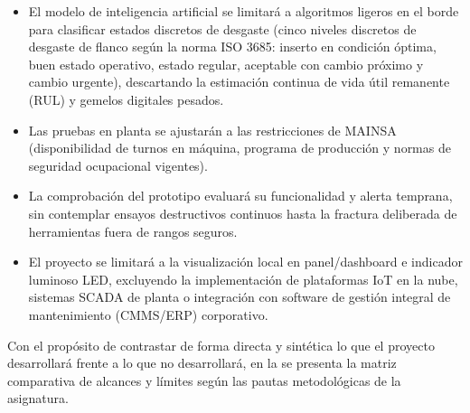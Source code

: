 \begin{itemize}
\item El modelo de inteligencia artificial se limitará a algoritmos ligeros en el borde para clasificar estados discretos de desgaste (cinco niveles discretos de desgaste de flanco según la norma ISO 3685: inserto en condición óptima, buen estado operativo, estado regular, aceptable con cambio próximo y cambio urgente), descartando la estimación continua de vida útil remanente (RUL) y gemelos digitales pesados.
\item Las pruebas en planta se ajustarán a las restricciones de MAINSA (disponibilidad de turnos en máquina, programa de producción y normas de seguridad ocupacional vigentes).
\item La comprobación del prototipo evaluará su funcionalidad y alerta temprana, sin contemplar ensayos destructivos continuos hasta la fractura deliberada de herramientas fuera de rangos seguros.
\item El proyecto se limitará a la visualización local en panel/dashboard e indicador luminoso LED, excluyendo la implementación de plataformas IoT en la nube, sistemas SCADA de planta o integración con software de gestión integral de mantenimiento (CMMS/ERP) corporativo.
\end{itemize}

\newpage
Con el propósito de contrastar de forma directa y sintética lo que el proyecto desarrollará frente a lo que no desarrollará, en la  se presenta la matriz comparativa de alcances y límites según las pautas metodológicas de la asignatura.

